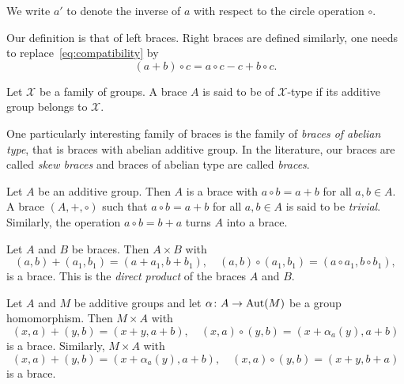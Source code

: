 We write $a'$ to denote the inverse of $a$ with respect to the circle operation $\circ$. 

Our definition is that of left braces. 
Right braces are defined similarly, one needs 
to replace~\eqref{eq:compatibility} by 
\[
(a+b)\circ c=a\circ c-c+b\circ c.
\]

\begin{definition}
    Let $\mathcal{X}$ be a family of groups. A brace $A$ is said to be
    of $\mathcal{X}$-type if its additive group belongs to $\mathcal{X}$.
\end{definition}

One particularly interesting family of braces is the family of \emph{braces of
abelian type}, that is braces with abelian additive group.  In the literature,
our braces are called \emph{skew braces} and braces of abelian type are called
\emph{braces}. 

\begin{example}
	\label{exa:trivial}
	Let $A$ be an additive group. Then $A$ is a brace with
	$a\circ b=a+b$ for all $a,b\in A$. 
	A brace $(A,+,\circ)$ such that $a\circ b=a+b$ for all $a,b\in A$ is
    said to be \emph{trivial}. 
	Similarly, the
   operation $a\circ b=b+a$ turns $A$ into a brace. 
\end{example}

\begin{example}
	\label{exa:times}
	Let $A$ and $B$ be braces. Then $A\times B$ with 
	\[
		(a,b)+(a_1,b_1)=(a+a_1,b+b_1),\quad
		(a,b)\circ (a_1,b_1)=(a\circ a_1,b\circ b_1),
	\]
	is a brace. This is the {\em direct product} of the braces $A$ and $B$. 
\end{example}

\begin{example}
	\label{exa:sd}
	Let $A$ and $M$ be additive groups and let $\alpha\colon A\to\operatorname{Aut}(M)$ be a
	group homomorphism. Then $M\times A$ with 
	\[
	(x,a)+(y,b)=(x+y,a+b),
	\quad
	(x,a)\circ (y,b)=(x+\alpha_a(y),a+b)
	\]
	is a brace. Similarly, $M\times A$ with
	\[
	(x,a)+(y,b)=(x+\alpha_a(y),a+b),\quad
	(x,a)\circ (y,b)=(x+y,b+a)
	\]
	is a brace. 
\end{example}

